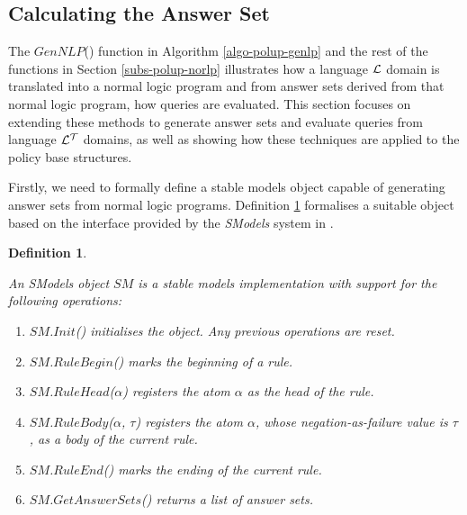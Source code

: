 \documentclass[11pt]{report}
\newtheorem{vdefinition}{Definition}[chapter]
\begin{document}
      \subsection{Calculating the Answer Set}

        The $GenNLP$() function in Algorithm \ref{algo-polup-genlp} and the
        rest of the functions in Section \ref{subs-polup-norlp} illustrates
        how a language ${\cal L}$ domain is translated into a normal logic
        program and from answer sets derived from that normal logic program,
        how queries are evaluated. This section focuses on extending these
        methods to generate answer sets and evaluate queries from language
        ${\cal L^T}$ domains, as well as showing how these techniques are
        applied to the policy base structures.

        Firstly, we need to formally define a stable models object capable
        of generating answer sets from normal logic programs. Definition
        \ref{defn-impln-smobj} formalises a suitable object based on the
        interface provided by the {\em SModels} system in \cite{NIE,SIM2}.

        \begin{vdefinition}
          \label{defn-impln-smobj}

          An SModels object $SM$ is a stable models implementation with
          support for the following operations:

          \begin{enumerate}
            \item
              $SM$.$Init$() initialises the object. Any previous operations are
              reset.
 
            \item
              $SM$.$RuleBegin$() marks the beginning of a rule.
 
            \item
              $SM$.$RuleHead$($\alpha$) registers the atom $\alpha$ as the
              head of the rule.
 
            \item
              $SM$.$RuleBody$($\alpha$, $\tau$) registers the atom $\alpha$,
              whose negation-as-failure value is $\tau$, as a body of the
              current rule.
 
            \item
              $SM$.$RuleEnd$() marks the ending of the current rule.
 
            \item
              $SM$.$GetAnswerSets$() returns a list of answer sets.
          \end{enumerate}
        \end{vdefinition}
\end{document}
